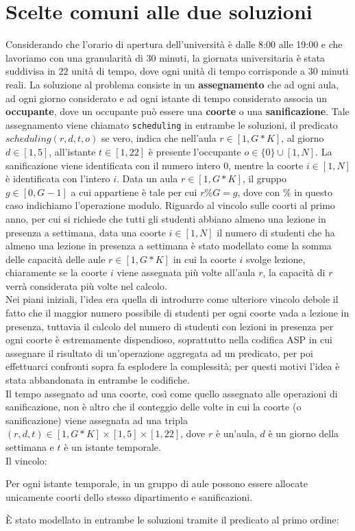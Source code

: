 \documentclass[12pt,english, openany]{book}
\begin{document}
\chapter{Scelte comuni alle due soluzioni}
Considerando che l'orario di apertura dell'università è dalle 8:00 alle 19:00 e che lavoriamo con una granularità di 30 minuti, la giornata universitaria è stata suddivisa in $22$ unità di tempo, dove ogni unità di tempo corrisponde a 30 minuti reali.
La soluzione al problema consiste in un \textbf{assegnamento} che ad ogni aula, ad ogni giorno considerato e ad ogni istante di tempo considerato associa un \textbf{occupante}, dove un occupante può essere una \textbf{coorte} o una \textbf{sanificazione}. Tale assegnamento viene chiamato \texttt{scheduling} in entrambe le soluzioni, il predicato $scheduling(r,d,t,o)$ se vero, indica che nell'aula $r \in \left[1, G*K \right]$, al giorno $d \in \left[1, 5 \right]$, all'istante $t \in \left[ 1, 22 \right]$ è presente l'occupante $o \in \lbrace 0 \rbrace \cup \left[1, N \right]$.
La sanificazione viene identificata con il numero intero $0$, mentre la coorte $i \in \left[1, N \right]$ è identificata con l'intero $i$.
Data un aula $r \in \left[1, G*K \right]$, il gruppo $g \in \left[0, G-1\right]$ a cui appartiene è tale per cui $r \% G = g$, dove con $\%$ in questo caso indichiamo l'operazione modulo.
Riguardo al vincolo sulle coorti al primo anno, per cui si richiede che tutti gli studenti abbiano almeno una lezione in presenza a settimana, data una coorte $i \in \left[1, N\right]$ il numero di studenti che ha almeno una lezione in presenza a settimana è stato modellato come la somma delle capacità delle aule $r \in \left[1, G*K\right]$ in cui la coorte $i$ svolge lezione, chiaramente se la coorte $i$ viene assegnata più volte all'aula $r$, la capacità di $r$ verrà considerata più volte nel calcolo.\\
Nei piani iniziali, l'idea era quella di introdurre come ulteriore vincolo debole il fatto che il maggior numero possibile di studenti per ogni coorte vada a lezione in presenza, tuttavia il calcolo del numero di studenti con lezioni in presenza per ogni coorte è estremamente dispendioso, soprattutto nella codifica ASP in cui assegnare il risultato di un'operazione aggregata ad un predicato, per poi effettuarci confronti sopra fa esplodere la complessità; per questi motivi l'idea è stata abbandonata in entrambe le codifiche.\\
Il tempo assegnato ad una coorte, così come quello assegnato alle operazioni di sanificazione, non è altro che il conteggio delle volte in cui la coorte (o sanificazione) viene assegnata ad una tripla $(r, d, t) \in \left[1, G*K \right] \times \left[1, 5 \right] \times \left[1, 22\right]$, dove $r$ è un'aula, $d$ è un giorno della settimana e $t$ è un istante temporale.\\
Il vincolo:
\begin{tcolorbox}[title=\textbf{Vincolo aule-dipartimenti}]
Per ogni istante temporale, in un gruppo di aule possono essere allocate unicamente coorti dello stesso dipartimento e sanificazioni.
\end{tcolorbox}
È stato modellato in entrambe le soluzioni tramite il predicato al primo ordine:
\end{document}
